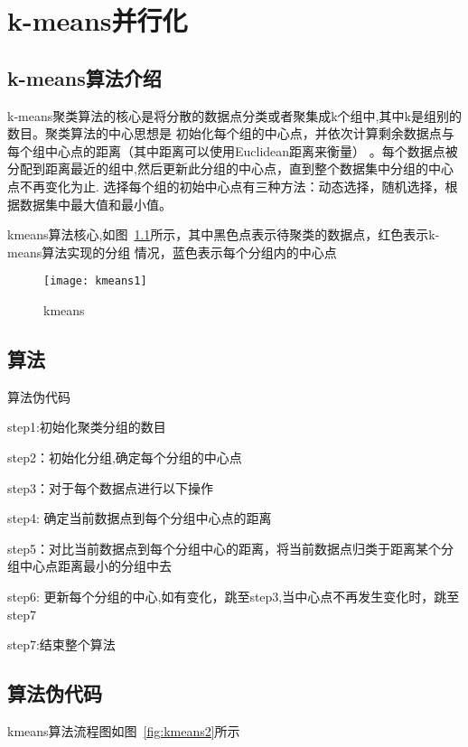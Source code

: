 
\chapter[k-means并行化]{k-means并行化}
\section{k-means算法介绍}
    k-means聚类算法的核心是将分散的数据点分类或者聚集成k个组中,其中k是组别的数目。聚类算法的中心思想是
初始化每个组的中心点，并依次计算剩余数据点与每个组中心点的距离（其中距离可以使用Euclidean距离来衡量）
。每个数据点被分配到距离最近的组中,然后更新此分组的中心点，直到整个数据集中分组的中心点不再变化为止.
选择每个组的初始中心点有三种方法：动态选择，随机选择，根据数据集中最大值和最小值。

   kmeans算法核心,如图~\ref{fig:kmeans1}所示，其中黑色点表示待聚类的数据点，红色表示k-means算法实现的分组
情况，蓝色表示每个分组内的中心点

    \begin{figure}[htbp]
    \centering
    \texttt{[image: kmeans1]}
    \caption{kmeans}\label{fig:kmeans1}
    \vspace{\baselineskip}
    \end{figure}

\section{算法}

    算法伪代码  

    step1:初始化聚类分组的数目

    step2：初始化分组,确定每个分组的中心点

    step3：对于每个数据点进行以下操作

            step4: 确定当前数据点到每个分组中心点的距离

            step5：对比当前数据点到每个分组中心的距离，将当前数据点归类于距离某个分组中心点距离最小的分组中去

            step6: 更新每个分组的中心,如有变化，跳至step3,当中心点不再发生变化时，跳至step7

    step7:结束整个算法      
            
\section{算法伪代码}

   kmeans算法流程图如图~\ref{fig:kmeans2}所示

